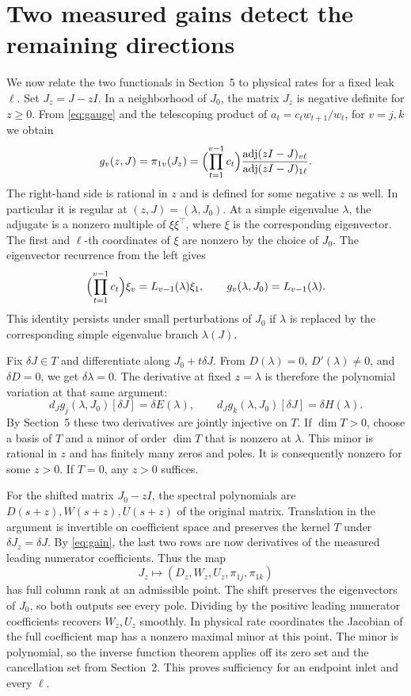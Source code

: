 \documentclass[11pt,a4paper]{article}
\newcommand{\sect}[1]{\section{#1}}
\begin{document}
\sect{Two measured gains detect the remaining directions}
We now relate the two functionals in Section~5 to physical rates for a fixed leak \(\ell\). Set \(J_z=J-zI\). In a neighborhood of \(J_0\), the matrix \(J_z\) is negative definite for \(z\ge0\). From \eqref{eq:gauge} and the telescoping product of \(a_t=c_t w_{t+1}/w_t\), for \(v=j,k\) we obtain
\begin{equation}
 g_v(z,J)=\pi_{1v}(J_z)
 =\Bigl(\prod_{t=1}^{v-1}c_t\Bigr)
 \frac{\operatorname{adj}(zI-J)_{v\ell}}{\operatorname{adj}(zI-J)_{1\ell}}.
 \label{eq:gain}
\end{equation}
The right-hand side is rational in \(z\) and is defined for some negative \(z\) as well. In particular it is regular at \((z,J)=(\lambda,J_0)\). At a simple eigenvalue \(\lambda\), the adjugate is a nonzero multiple of \(\xi\xi^\top\), where \(\xi\) is the corresponding eigenvector. The first and \(\ell\)-th coordinates of \(\xi\) are nonzero by the choice of \(J_0\). The eigenvector recurrence from the left gives
\[
 \Bigl(\prod_{t=1}^{v-1}c_t\Bigr)\xi_v=L_{v-1}(\lambda)\xi_1,\qquad
                    g_v(\lambda,J_0)=L_{v-1}(\lambda).
\]
This identity persists under small perturbations of \(J_0\) if \(\lambda\) is replaced by the corresponding simple eigenvalue branch \(\lambda(J)\).

Fix \(\delta J\in T\) and differentiate along \(J_0+t\delta J\). From \(D(\lambda)=0\), \(D'(\lambda)\ne0\), and \(\delta D=0\), we get \(\delta\lambda=0\). The derivative at fixed \(z=\lambda\) is therefore the polynomial variation at that same argument:
\[
 d_J g_j(\lambda,J_0)[\delta J]=\delta E(\lambda),\qquad
 d_J g_k(\lambda,J_0)[\delta J]=\delta H(\lambda).
\]
By Section~5 these two derivatives are jointly injective on \(T\). If \(\dim T>0\), choose a basis of \(T\) and a minor of order \(\dim T\) that is nonzero at \(\lambda\). This minor is rational in \(z\) and has finitely many zeros and poles. It is consequently nonzero for some \(z>0\). If \(T=0\), any \(z>0\) suffices.

For the shifted matrix \(J_0-zI\), the spectral polynomials are \(D(s+z),W(s+z),U(s+z)\) of the original matrix. Translation in the argument is invertible on coefficient space and preserves the kernel \(T\) under \(\delta J_z=\delta J\). By \eqref{eq:gain}, the last two rows are now derivatives of the measured leading numerator coefficients. Thus the map
\[
             J_z\longmapsto(D_z,W_z,U_z,\pi_{1j},\pi_{1k})
\]
has full column rank at an admissible point. The shift preserves the eigenvectors of \(J_0\), so both outputs see every pole. Dividing by the positive leading numerator coefficients recovers \(W_z,U_z\) smoothly. In physical rate coordinates the Jacobian of the full coefficient map has a nonzero maximal minor at this point. The minor is polynomial, so the inverse function theorem applies off its zero set and the cancellation set from Section~2. This proves sufficiency for an endpoint inlet and every \(\ell\).
\end{document}
